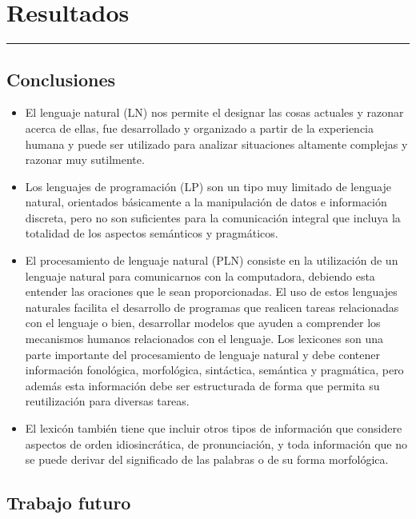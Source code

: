 \chapter{Resultados}
\hrule \bigskip \vspace*{1cm}
\section{Conclusiones}
\begin{itemize}
  \item El lenguaje natural (LN) nos permite el designar las cosas actuales y razonar acerca de ellas, fue desarrollado y organizado a partir de la experiencia humana y puede ser utilizado para analizar situaciones altamente complejas y razonar muy sutilmente.
 \item  Los lenguajes de programación (LP) son un tipo muy limitado de lenguaje natural, orientados básicamente a la manipulación de datos e información discreta, pero no son suficientes para la comunicación integral que incluya la totalidad de los aspectos semánticos y pragmáticos.
 \item  El procesamiento de lenguaje natural (PLN) consiste en la utilización de un lenguaje natural para comunicarnos con la computadora, debiendo esta entender las oraciones que le sean proporcionadas. El uso de estos lenguajes naturales facilita el desarrollo de programas que realicen tareas relacionadas con el lenguaje o bien, desarrollar modelos que ayuden a comprender los mecanismos humanos relacionados con el lenguaje. Los lexicones son una parte importante del procesamiento de lenguaje natural y debe contener información fonológica, morfológica, sintáctica, semántica y pragmática, pero además esta información debe ser estructurada de forma que permita su reutilización para diversas tareas.
 \item  El lexicón también tiene que incluir otros tipos de información que considere aspectos de orden idiosincrática, de pronunciación, y toda información que no se puede derivar del significado de las palabras o de su forma morfológica.
\end{itemize}

\section{Trabajo futuro}

